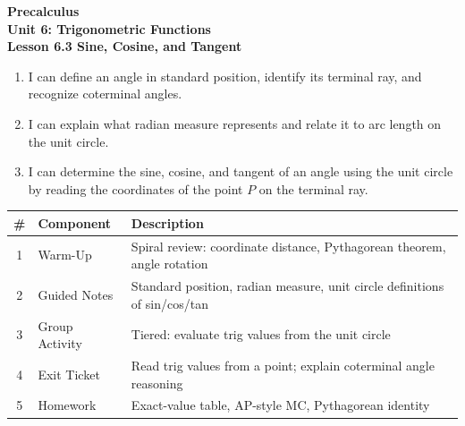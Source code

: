\documentclass[10pt]{article}
\begin{document}
\vspace{-0.8in}

\begin{center}
  {\color{white}\textbf{\LARGE Precalculus}}\\[4pt]
  {\color{skymid}\large\textbf{Unit 6: Trigonometric Functions}}\\[6pt]
  {\color{white}\textbf{\large Lesson 6.3 \quad Sine, Cosine, and Tangent}}
\end{center}

\vspace{0.22in}
\namedateperiod
\vspace{0.18in}

\begin{learningtargetbox}
\small
\begin{enumerate}[leftmargin=1.5em, itemsep=5pt]
  \item I can define an angle in standard position, identify its terminal ray, and recognize
        coterminal angles.
  \item I can explain what radian measure represents and relate it to arc length on the unit circle.
  \item I can determine the sine, cosine, and tangent of an angle using the unit circle by reading
        the coordinates of the point $P$ on the terminal ray.
\end{enumerate}
\end{learningtargetbox}

\vspace{0.14in}

\begin{tocbox}
\small
\renewcommand{\arraystretch}{1.5}
\begin{tabularx}{\linewidth}{@{} c l X @{}}
\rowcolor{sky}
\textbf{\#} & \textbf{Component} & \textbf{Description} \\
\midrule
1 & Warm-Up        & Spiral review: coordinate distance, Pythagorean theorem, angle rotation \\
2 & Guided Notes   & Standard position, radian measure, unit circle definitions of sin/cos/tan \\
3 & Group Activity & Tiered: evaluate trig values from the unit circle \\
4 & Exit Ticket    & Read trig values from a point; explain coterminal angle reasoning \\
5 & Homework       & Exact-value table, AP-style MC, Pythagorean identity \\
\end{tabularx}
\end{tocbox}
\end{document}
